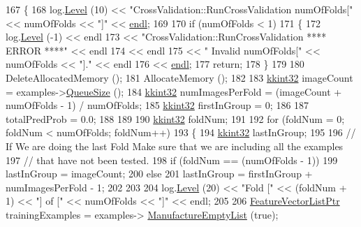 \begin{DoxyCode}
167 \{
168   log.\hyperlink{class_k_k_b_1_1_run_log_a32cf761d7f2e747465fd80533fdbb659}{Level} (10) << \textcolor{stringliteral}{"CrossValidation::RunCrossValidation    numOfFolds["} << numOfFolds << \textcolor{stringliteral}{"]"} << 
      \hyperlink{namespace_k_k_b_ad1f50f65af6adc8fa9e6f62d007818a8}{endl};
169 
170   \textcolor{keywordflow}{if}  (numOfFolds < 1)
171   \{
172     log.\hyperlink{class_k_k_b_1_1_run_log_a32cf761d7f2e747465fd80533fdbb659}{Level} (-1) << endl
173                    << \textcolor{stringliteral}{"CrossValidation::RunCrossValidation     **** ERROR ****"} << endl
174                    << endl
175                    << \textcolor{stringliteral}{"                                  Invalid  numOfFolds["} << numOfFolds << \textcolor{stringliteral}{"]."} << 
      endl
176                    << \hyperlink{namespace_k_k_b_ad1f50f65af6adc8fa9e6f62d007818a8}{endl};
177     \textcolor{keywordflow}{return};
178   \}
179 
180   DeleteAllocatedMemory ();
181   AllocateMemory ();
182 
183   \hyperlink{namespace_k_k_b_a8fa4952cc84fda1de4bec1fbdd8d5b1b}{kkint32}  imageCount       = examples->\hyperlink{class_k_k_b_1_1_k_k_queue_a1dab601f75ee6a65d97f02bddf71c40d}{QueueSize} ();
184   \hyperlink{namespace_k_k_b_a8fa4952cc84fda1de4bec1fbdd8d5b1b}{kkint32}  numImagesPerFold = (imageCount + numOfFolds - 1) / numOfFolds;
185   \hyperlink{namespace_k_k_b_a8fa4952cc84fda1de4bec1fbdd8d5b1b}{kkint32}  firstInGroup     = 0;
186 
187   totalPredProb = 0.0;
188 
189 
190   \hyperlink{namespace_k_k_b_a8fa4952cc84fda1de4bec1fbdd8d5b1b}{kkint32}  foldNum;
191 
192   \textcolor{keywordflow}{for}  (foldNum = 0;  foldNum < numOfFolds;  foldNum++)
193   \{
194     \hyperlink{namespace_k_k_b_a8fa4952cc84fda1de4bec1fbdd8d5b1b}{kkint32}  lastInGroup;
195 
196     \textcolor{comment}{// If We are doing the last Fold Make sure that we are including all the examples }
197     \textcolor{comment}{// that have not been tested.}
198     \textcolor{keywordflow}{if}  (foldNum == (numOfFolds - 1))
199       lastInGroup = imageCount;
200     \textcolor{keywordflow}{else}
201       lastInGroup = firstInGroup + numImagesPerFold - 1;
202 
203 
204     log.\hyperlink{class_k_k_b_1_1_run_log_a32cf761d7f2e747465fd80533fdbb659}{Level} (20) << \textcolor{stringliteral}{"Fold ["} << (foldNum + 1) << \textcolor{stringliteral}{"]  of  ["} << numOfFolds << \textcolor{stringliteral}{"]"} << endl;
205 
206     \hyperlink{class_k_k_m_l_l_1_1_feature_vector_list}{FeatureVectorListPtr}  trainingExamples = examples->
      \hyperlink{class_k_k_m_l_l_1_1_feature_vector_list_af533da1b34e4123f4fcb1343d5f48e37}{ManufactureEmptyList} (\textcolor{keyword}{true});

\end{DoxyCode}
